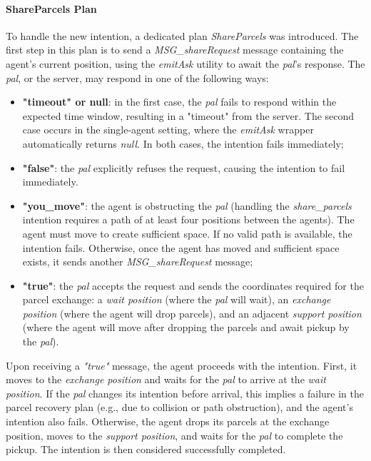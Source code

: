                \paragraph{ShareParcels Plan}
                    To handle the new intention, a dedicated plan \textit{ShareParcels} was introduced. The first step in this plan is to send a \textit{MSG\_shareRequest} message containing the agent's current position, using the \textit{emitAsk} utility to await the \textit{pal}'s response. The \textit{pal}, or the server, may respond in one of the following ways:
                    \begin{itemize}
                        \item \textbf{"timeout" or null}: in the first case, the \textit{pal} fails to respond within the expected time window, resulting in a "timeout" from the server. The second case occurs in the single-agent setting, where the \textit{emitAsk} wrapper automatically returns \textit{null}. In both cases, the intention fails immediately;
                        \item \textbf{"false"}: the \textit{pal} explicitly refuses the request, causing the intention to fail immediately.
                        \item \textbf{"you\_move"}: the agent is obstructing the \textit{pal} (handling the \textit{share\_parcels} intention requires a path of at least four positions between the agents). The agent must move to create sufficient space. If no valid path is available, the intention fails. Otherwise, once the agent has moved and sufficient space exists, it sends another \textit{MSG\_shareRequest} message;
                        \item \textbf{"true"}: the \textit{pal} accepts the request and sends the coordinates required for the parcel exchange: a \textit{wait position} (where the \textit{pal} will wait), an \textit{exchange position} (where the agent will drop parcels), and an adjacent \textit{support position} (where the agent will move after dropping the parcels and await pickup by the \textit{pal}).
                    \end{itemize}                   
                    Upon receiving a \textit{"true"} message, the agent proceeds with the intention. First, it moves to the \textit{exchange position} and waits for the \textit{pal} to arrive at the \textit{wait position}. If the \textit{pal} changes its intention before arrival, this implies a failure in the parcel recovery plan (e.g., due to collision or path obstruction), and the agent's intention also fails. Otherwise, the agent drops its parcels at the exchange position, moves to the \textit{support position}, and waits for the \textit{pal} to complete the pickup. The intention is then considered successfully completed.


